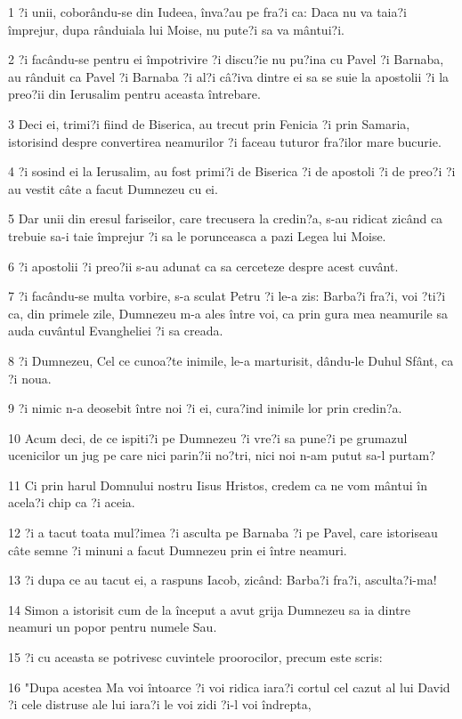 \par 1 ?i unii, coborându-se din Iudeea, înva?au pe fra?i ca: Daca nu va taia?i împrejur, dupa rânduiala lui Moise, nu pute?i sa va mântui?i.
\par 2 ?i facându-se pentru ei împotrivire ?i discu?ie nu pu?ina cu Pavel ?i Barnaba, au rânduit ca Pavel ?i Barnaba ?i al?i câ?iva dintre ei sa se suie la apostolii ?i la preo?ii din Ierusalim pentru aceasta întrebare.
\par 3 Deci ei, trimi?i fiind de Biserica, au trecut prin Fenicia ?i prin Samaria, istorisind despre convertirea neamurilor ?i faceau tuturor fra?ilor mare bucurie.
\par 4 ?i sosind ei la Ierusalim, au fost primi?i de Biserica ?i de apostoli ?i de preo?i ?i au vestit câte a facut Dumnezeu cu ei.
\par 5 Dar unii din eresul fariseilor, care trecusera la credin?a, s-au ridicat zicând ca trebuie sa-i taie împrejur ?i sa le porunceasca a pazi Legea lui Moise.
\par 6 ?i apostolii ?i preo?ii s-au adunat ca sa cerceteze despre acest cuvânt.
\par 7 ?i facându-se multa vorbire, s-a sculat Petru ?i le-a zis: Barba?i fra?i, voi ?ti?i ca, din primele zile, Dumnezeu m-a ales între voi, ca prin gura mea neamurile sa auda cuvântul Evangheliei ?i sa creada.
\par 8 ?i Dumnezeu, Cel ce cunoa?te inimile, le-a marturisit, dându-le Duhul Sfânt, ca ?i noua.
\par 9 ?i nimic n-a deosebit între noi ?i ei, cura?ind inimile lor prin credin?a.
\par 10 Acum deci, de ce ispiti?i pe Dumnezeu ?i vre?i sa pune?i pe grumazul ucenicilor un jug pe care nici parin?ii no?tri, nici noi n-am putut sa-l purtam?
\par 11 Ci prin harul Domnului nostru Iisus Hristos, credem ca ne vom mântui în acela?i chip ca ?i aceia.
\par 12 ?i a tacut toata mul?imea ?i asculta pe Barnaba ?i pe Pavel, care istoriseau câte semne ?i minuni a facut Dumnezeu prin ei între neamuri.
\par 13 ?i dupa ce au tacut ei, a raspuns Iacob, zicând: Barba?i fra?i, asculta?i-ma!
\par 14 Simon a istorisit cum de la început a avut grija Dumnezeu sa ia dintre neamuri un popor pentru numele Sau.
\par 15 ?i cu aceasta se potrivesc cuvintele proorocilor, precum este scris:
\par 16 "Dupa acestea Ma voi întoarce ?i voi ridica iara?i cortul cel cazut al lui David ?i cele distruse ale lui iara?i le voi zidi ?i-l voi îndrepta,

